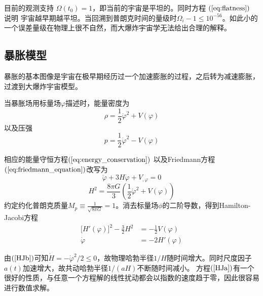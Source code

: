 目前的观测支持 $\Omega(t_0)=1$，即当前的宇宙是平坦的。同时方程
$(\ref{eq:flatness})$ 说明
宇宙越早期越平坦。当回溯到普朗克时间的量级时$\Omega_i-1 \leq
10^{-56}$。如此小的一个误差量级在物理上很不自然，而大爆炸宇宙学无法给出合理的解释。

\subsection{暴胀模型}
暴胀的基本图像是宇宙在极早期经历过一个加速膨胀的过程，之后转为减速膨胀，过渡到大爆炸宇宙模型。

当暴胀场用标量场$\varphi$描述时，能量密度为
\begin{equation}\label{eq:energy_density}
    \rho = \frac{1}{2}\dot{\varphi}^2+V(\varphi)
\end{equation}
以及压强
\begin{equation}\label{eq:pressure}
    p=\frac{1}{2}\dot{\varphi}^2-V(\varphi)
\end{equation}

相应的能量守恒方程$(\ref{eq:energy_conservation})$
以及Friedmann方程$(\ref{eq:friedmann_equation})$改写为
\begin{equation}
    \ddot{\varphi}+3H\dot\varphi+V_{,\varphi}=0 
\end{equation}
\begin{equation}
    H^2=\frac{8\pi G}{3}\left(\frac{1}{2}\dot\varphi^2+V(\varphi)\right)
\end{equation}
约定约化普朗克质量$M_p\equiv\frac{1}{\sqrt{8\pi G}}=1$。消去标量场$\phi$的二阶导数，得到Hamilton-Jacobi方程
    \begin{align}
        \lbrack H'(\varphi)\rbrack^2 - \frac{3}{2}H^2 &=
        -\frac{1}{2}V(\varphi)\label{HJa} \\
        \dot\varphi  &= -2H'(\varphi)\label{HJb}
    \end{align}

    由$(\ref{HJb})$可知$\dot H=-\dot \varphi^2/2\leq 0$，故物理哈勃半径$1/H$随时间增大。同时尺度因子$a(t)$加速增大，故共动哈勃半径$1/(aH)$不断随时间减小。
    方程$(\ref{HJa})$有一个很好的性质，与任意一个方程解的线性扰动都会以指数的速度趋于零，因此很容易进行数值求解。
